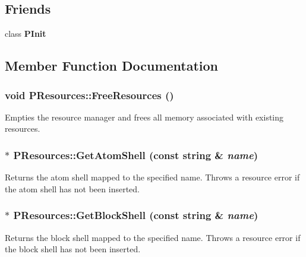 \subsection*{Friends}
\begin{CompactItemize}
\item 
class {\bf PInit}
\end{CompactItemize}


\subsection{Member Function Documentation}
\subsubsection{\setlength{\rightskip}{0pt plus 5cm}void PResources::Free\-Resources ()\hspace{0.3cm}{\tt  [static]}}\label{classPResources_8eddbe7ca94517c468ac8e7dcfcc13a5}


Empties the resource manager and frees all memory associated with existing resources. 
\subsubsection{ $\ast$ PResources::Get\-Atom\-Shell (const string \& {\em name})\hspace{0.3cm}{\tt  [static]}}\label{classPResources_80cf6b4ab893acf412f81660b8a5d0e7}


Returns the atom shell mapped to the specified name. Throws a resource error if the atom shell has not been inserted. 
\subsubsection{ $\ast$ PResources::Get\-Block\-Shell (const string \& {\em name})\hspace{0.3cm}{\tt  [static]}}\label{classPResources_bc3ebf4ecdf1cb7b793f9b4a6a667bf2}


Returns the block shell mapped to the specified name. Throws a resource error if the block shell has not been inserted. 
